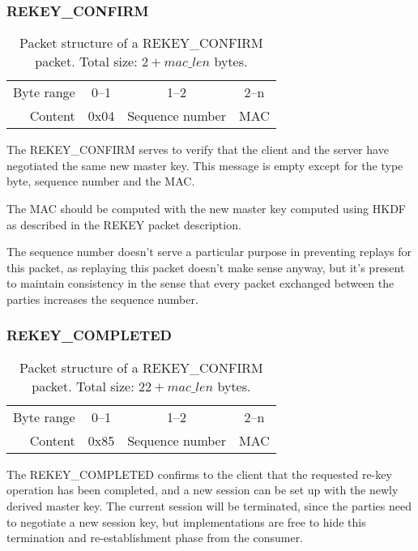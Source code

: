         \subsubsection{REKEY\_CONFIRM}

\begin{table}[ht!]
\centering
    \begin{tabular}{r | c | c | c |}
    \cline{2-4}
    Byte range & 0--1 & 1--2 & 2--n \\ \cline{2-4}
    Content & 0x04 & Sequence number & MAC \\ \cline{2-4}
    \end{tabular}
    \caption{Packet structure of a REKEY\_CONFIRM packet. Total size: \( 2 + mac\_len \) bytes.}
\end{table}

The REKEY\_CONFIRM serves to verify that the client and the server have negotiated the same new master key. This message is empty except for the type byte, sequence number and the MAC.

The MAC should be computed with the new master key computed using HKDF as described in the REKEY packet description.

The sequence number doesn't serve a particular purpose in preventing replays for this packet, as replaying this packet doesn't make sense anyway, but it's present to maintain consistency in the sense that every packet exchanged between the parties increases the sequence number.


        \subsubsection{REKEY\_COMPLETED}

\begin{table}[ht!]
\centering
    \begin{tabular}{r | c | c | c |}
    \cline{2-4}
    Byte range & 0--1 & 1--2 & 2--n \\ \cline{2-4}
    Content & 0x85 & Sequence number & MAC \\ \cline{2-4}
    \end{tabular}
    \caption{Packet structure of a REKEY\_CONFIRM packet. Total size: \( 22 + mac\_len \) bytes.}
\end{table}

The REKEY\_COMPLETED confirms to the client that the requested re-key operation has been completed, and a new session can be set up with the newly derived master key. The current session will be terminated, since the parties need to negotiate a new session key, but implementations are free to hide this termination and re-establishment phase from the consumer.


